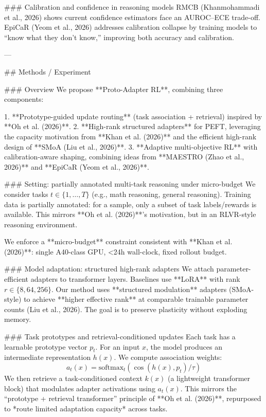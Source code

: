 ### Calibration and confidence in reasoning models  
RMCB (Khanmohammadi et al., 2026) shows current confidence estimators face an AUROC–ECE trade-off. EpiCaR (Yeom et al., 2026) addresses calibration collapse by training models to “know what they don’t know,” improving both accuracy and calibration.

---

## Methods / Experiment  

### Overview  
We propose **Proto-Adapter RL**, combining three components:

1. **Prototype-guided update routing** (task association + retrieval) inspired by **Oh et al. (2026)**.  
2. **High-rank structured adapters** for PEFT, leveraging the capacity motivation from **Khan et al. (2026)** and the efficient high-rank design of **SMoA (Liu et al., 2026)**.  
3. **Adaptive multi-objective RL** with calibration-aware shaping, combining ideas from **MAESTRO (Zhao et al., 2026)** and **EpiCaR (Yeom et al., 2026)**.

### Setting: partially annotated multi-task reasoning under micro-budget  
We consider tasks \(t \in \{1,\dots,T\}\) (e.g., math reasoning, general reasoning). Training data is partially annotated: for a sample, only a subset of task labels/rewards is available. This mirrors **Oh et al. (2026)**’s motivation, but in an RLVR-style reasoning environment.

We enforce a **micro-budget** constraint consistent with **Khan et al. (2026)**: single A40-class GPU, <24h wall-clock, fixed rollout budget.

### Model adaptation: structured high-rank adapters  
We attach parameter-efficient adapters to transformer layers. Baselines use **LoRA** with rank \(r \in \{8, 64, 256\}\). Our method uses **structured modulation** adapters (SMoA-style) to achieve **higher effective rank** at comparable trainable parameter counts (Liu et al., 2026). The goal is to preserve plasticity without exploding memory.

### Task prototypes and retrieval-conditioned updates  
Each task has a learnable prototype vector \(p_t\). For an input \(x\), the model produces an intermediate representation \(h(x)\). We compute association weights:
\[
a_t(x) = \text{softmax}_t(\cos(h(x), p_t)/\tau)
\]
We then retrieve a task-conditioned context \(k(x)\) (a lightweight transformer block) that modulates adapter activations using \(a_t(x)\). This mirrors the “prototype + retrieval transformer” principle of **Oh et al. (2026)**, repurposed to *route limited adaptation capacity* across tasks.

